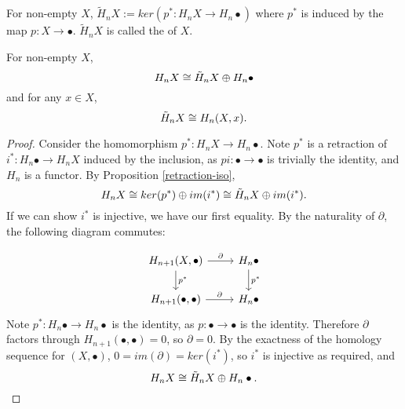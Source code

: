 \begin{definition}
For non-empty $X$, $\tilde{H}_nX:=ker(p^*:H_nX\rightarrow H_n\bullet)$ where $p^*$ is induced by the map $p:X\rightarrow \bullet$. $\tilde{H}_nX$ is called the  of $X$.
\end{definition}

\begin{prop}
\label{reduced-homology}
For non-empty $X$,
$$H_nX\cong\tilde{H}_nX\oplus H_n\bullet$$
and for any $x\in X$, $$\tilde{H}_nX\cong H_n(X,x).$$
\end{prop}
\begin{proof}
Consider the homomorphism $p^*:H_nX\rightarrow H_n\bullet$. Note $p^*$ is a retraction of $i^*:H_n\bullet \rightarrow H_n X$ induced by the inclusion, as $pi:\bullet\rightarrow \bullet$ is trivially the identity, and $H_n$ is a functor. By Proposition \ref{retraction-iso}, $$H_nX\cong ker(p^*)\oplus im(i^*) \cong \tilde{H}_nX\oplus im(i^*).$$ If we can show $i^*$ is injective, we have our first equality. By the naturality of $\partial$, the following diagram commutes:

\[\begin{tikzcd}
{H_{n+1}(X,\bullet)} \arrow[r, "\partial"] \arrow[d, "p^*"] & H_n\bullet \arrow[d, "p^*"] \\
{H_{n+1}(\bullet,\bullet)} \arrow[r, "\partial"]              & H_n\bullet                 
\end{tikzcd}\]
Note $p^*:H_n\bullet\rightarrow H_n\bullet$ is the identity, as $p:\bullet\rightarrow\bullet$ is the identity. Therefore $\partial$ factors through $H_{n+1}(\bullet,\bullet)=0$, so $\partial=0$. By the exactness of the homology sequence for $(X,\bullet)$, $0=im(\partial)=ker(i^*)$, so $i^*$ is injective as required, and $$H_nX\cong \tilde{H}_nX\oplus H_n\bullet.$$



\end{proof}
